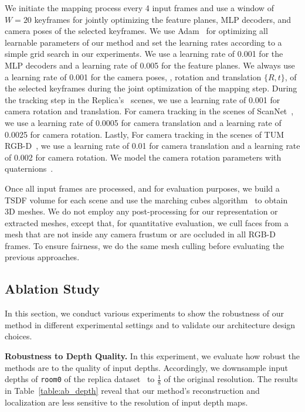 We initiate the mapping process every 4 input frames and use a window of $W=20$ keyframes for jointly optimizing the feature planes, MLP decoders, and camera poses of the selected keyframes. We use Adam~\citep{adam} for optimizing all learnable parameters of our method and set the learning rates according to a simple grid search in our experiments. We use a learning rate of 0.001 for the MLP decoders and a learning rate of 0.005 for the feature planes. We always use a learning rate of 0.001 for the camera poses, \ie, rotation and translation $\{R,t\}$, of the selected keyframes during the joint optimization of the mapping step. During the tracking step in the Replica's~\citep{replica19arxiv} scenes, we use a learning rate of 0.001 for camera rotation and translation. For camera tracking in the scenes of ScanNet~\citep{dai2017scannet}, we use a learning rate of 0.0005 for camera translation and a learning rate of 0.0025 for camera rotation. Lastly, For camera tracking in the scenes of TUM RGB-D~\citep{sturm2012benchmark}, we use a learning rate of 0.01 for camera translation and a learning rate of 0.002 for camera rotation. We model the camera rotation parameters with quaternions~\citep{shoemake1985animating}.

Once all input frames are processed, and for evaluation purposes, we build a TSDF volume for each scene and use the marching cubes algorithm~\citep{lorensen1987marching} to obtain 3D meshes. We do not employ any post-processing for our representation or extracted meshes, except that, for quantitative evaluation, we cull faces from a mesh that are not inside any camera frustum or are occluded in all RGB-D frames. To ensure fairness, we do the same mesh culling before evaluating the previous approaches.

\subsection{Ablation Study} \label{sec:c4_ablation}

In this section, we conduct various experiments to show the robustness of our method in different experimental settings and to validate our architecture design choices.

\vspace{1ex}
\noindent\textbf{Robustness to Depth Quality.} In this experiment, we evaluate how robust the methods are to the quality of input depths. Accordingly, we downsample input depths of \texttt{room0} of the replica dataset~\citep{replica19arxiv} to $\frac{1}{8}$ of the original resolution. The results in Table~\ref{table:ab_depth} reveal that our method's reconstruction and localization are less sensitive to the resolution of input depth maps.

